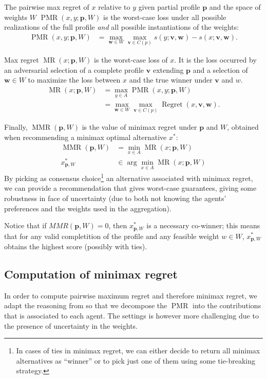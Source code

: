 \documentclass[12pt]{article}
\newcommand{\profile}{\textbf{v}}%
\newcommand{\pprofile}{\textbf{p}}%
\newcommand{\w}{\textbf{w}}%
\DeclareMathOperator{\Regret}{Regret}
\DeclareMathOperator{\PMR}{PMR}
\DeclareMathOperator{\MR}{MR}
\DeclareMathOperator{\MMR}{MMR}
\begin{document}
The pairwise max regret of $x$ relative to $y$ given partial profile $\pprofile$ and the space of weights $W$
$\PMR(x,y;\pprofile,W)$ is the worst-case loss under all possible realizations of the full profile {\em and} all possible instantiations of the weights:
\begin{align}
\PMR(x,y; \pprofile, W) & = \max_{\w \in W} \max_{\profile \in C(p)} s(y; \profile,\w) - s(x; \profile,\w).
\end{align}

Max regret $\MR(x;\pprofile,W)$ is the worst-case loss of $x$. It is the loss occurred by an adversarial selection of a complete profile $\profile$ extending $\pprofile$ and a selection of $\w \in W$ to maximize the loss between $x$ and the true winner under $\profile$ and $w$.
\begin{align}
\MR(x; \pprofile, W) & = \max_{y \in A} \PMR(x,y; \pprofile, W)\\
& = \max_{\w \in W} \max_{\profile \in C(p)} \Regret(x, \profile, \w).
\end{align}

Finally,  $\MMR(\pprofile,W)$ is the value of minimax regret under $\pprofile$ and $W$, obtained when recommending a minimax optimal alternative $x^*$:
\begin{align*}
\MMR(\pprofile,W) & = \min_{x \in A} \MR(x;\pprofile,W) \\
x^{*}_{\pprofile,W} & \in \arg\min_{x \in A} \MR(x;\pprofile,W) 
\end{align*}
By picking as consensus choice\footnote{In cases of ties in minimax regret, we can either decide to return all minimax alternatives as ``winner'' or to pick just one of them using some tie-breaking strategy.} an alternative associated with minimax regret, we can provide a recommendation that gives worst-case guarantees, giving some robustness in face of uncertainty (due to both not knowing the agents' preferences and the weights used in the aggregation). 

Notice that if $MMR(\pprofile, W)=0$, then $x^{*}_{\pprofile,W}$  is a necessary co-winner; this means that for any valid completition of the profile and any feasible weight $w \in W$, $x^{*}_{\pprofile,W}$ obtains the highest score (possibly with ties).

\subsection{Computation of minimax regret}
In order to compute pairwise maximum regret and therefore minimax regret, we adapt the reasoning from \cite{Lu2011} so that we decompose the $\PMR$ into the contributions that is associated to each agent.
The settings is however more challenging due to the presence of uncertainty in the weights.
\end{document}
